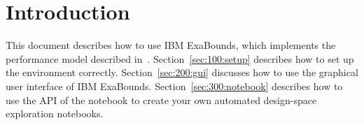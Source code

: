 \section{Introduction}

This document describes how to use IBM ExaBounds, which implements the performance model described in~\cite{Jongerius2016}. Section~\ref{sec:100:setup} describes how to set up the environment correctly. Section~\ref{sec:200:gui} discusses how to use the graphical user interface of IBM ExaBounds. Section~\ref{sec:300:notebook} describes how to use the API of the notebook to create your own automated design-space exploration notebooks.
